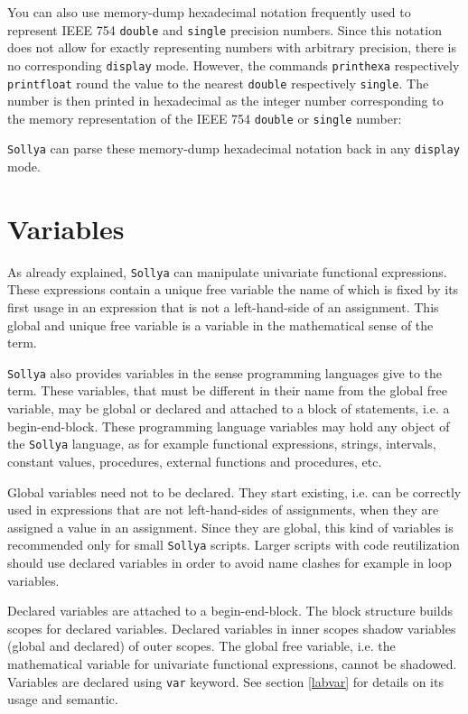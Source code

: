 \documentclass[a4paper]{article}
\newcommand{\com}[1]{\texttt{#1}}
\newcommand{\key}[1]{\texttt{#1}}
\newcommand{\sollya}{\texttt{Sollya}\xspace}
\begin{document}
You can also use memory-dump hexadecimal notation frequently used to represent IEEE 754 \texttt{double} and \texttt{single} precision numbers. Since this notation does not allow for exactly representing numbers with arbitrary precision, there is no corresponding \key{display} mode. However, the commands \com{printhexa} respectively \com{printfloat} round the value to the nearest \texttt{double} respectively \texttt{single}. The number is then printed in hexadecimal as the integer number corresponding to the memory representation of the IEEE 754 \texttt{double} or \texttt{single} number:



\sollya can parse these memory-dump hexadecimal notation back in any \key{display} mode.

\section{Variables}\label{variables}

As already explained, \sollya can manipulate univariate functional
expressions. These expressions contain a unique free variable the name
of which is fixed by its first usage in an expression that is not a
left-hand-side of an assignment. This global and unique free variable is 
a variable in the mathematical sense of the term. 

\sollya also provides variables in the sense programming languages
give to the term.  These variables, that must be different in their
name from the global free variable, may be global or declared and
attached to a block of statements, i.e. a begin-end-block. These
programming language variables may hold any object of the \sollya
language, as for example functional expressions, strings, intervals,
constant values, procedures, external functions and procedures, etc.

Global variables need not to be declared. They start existing,
i.e. can be correctly used in expressions that are not left-hand-sides
of assignments, when they are assigned a value in an assignment. Since
they are global, this kind of variables is recommended only for small
\sollya scripts.  Larger scripts with code reutilization should use
declared variables in order to avoid name clashes for example in loop
variables.

Declared variables are attached to a begin-end-block. The block
structure builds scopes for declared variables. Declared variables in
inner scopes shadow variables (global and declared) of outer
scopes. The global free variable, i.e. the mathematical variable for
univariate functional expressions, cannot be shadowed. Variables are
declared using \key{var} keyword. See section \ref{labvar} for details
on its usage and semantic.
\end{document}
